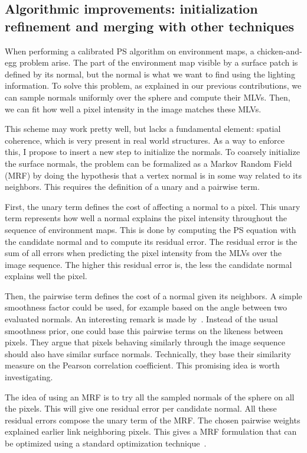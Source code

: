 \subsection{Algorithmic improvements: initialization refinement and merging with other techniques}

When performing a calibrated PS algorithm on environment maps, a chicken-and-egg problem arise. The part of the environment map visible by a surface patch is defined by its normal, but the normal is what we want to find using the lighting information. To solve this problem, as explained in our previous contributions, we can sample normals uniformly over the sphere and compute their MLVs. Then, we can fit how well a pixel intensity in the image matches these MLVs.

This scheme may work pretty well, but lacks a fundamental element: spatial coherence, which is very present in real world structures. As a way to enforce this, I propose to insert a new step to initialize the normals. To coarsely initialize the surface normals, the problem can be formalized as a Markov Random Field (MRF) by doing the hypothesis that a vertex normal is in some way related to its neighbors. This requires the definition of a unary and a pairwise term.

First, the unary term defines the cost of affecting a normal to a pixel. This unary term represents how well a normal explains the pixel intensity throughout the sequence of environment maps. This is done by computing the PS equation with the candidate normal and to compute its residual error. The residual error is the sum of all errors when predicting the pixel intensity from the MLVs over the image sequence. The higher this residual error is, the less the candidate normal explains well the pixel.

Then, the pairwise term defines the cost of a normal given its neighbors. A simple smoothness factor could be used, for example based on the angle between two evaluated normals. An interesting remark is made by~\cite{jung-cvpr-15}. Instead of the usual smoothness prior, one could base this pairwise terms on the likeness between pixels. They argue that pixels behaving similarly through the image sequence should also have similar surface normals. Technically, they base their similarity measure on the Pearson correlation coefficient. This promising idea is worth investigating.

The idea of using an MRF is to try all the sampled normals of the sphere on all the pixels. This will give one residual error per candidate normal. All these residual errors compose the unary term of the MRF. The chosen pairwise weights explained earlier link neighboring pixels. This gives a MRF formulation that can be optimized using a standard optimization technique~\cite{Boykov2001a,Kolmogorov2004a,Boykov2004,Bagon2006}.

